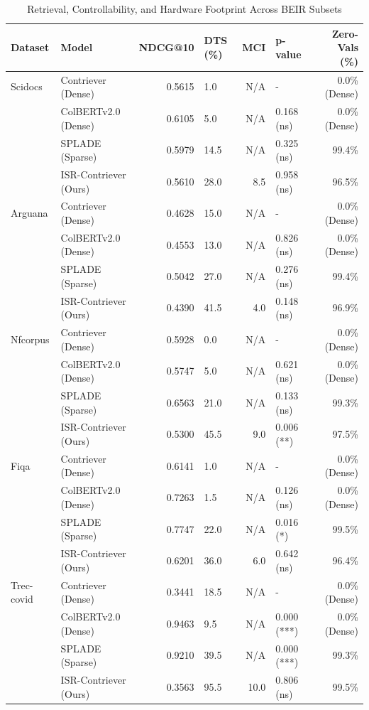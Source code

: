 \documentclass[sigconf,authordraft]{acmart}
\begin{document}
\begin{table}[htbp]
\centering
\caption{Retrieval, Controllability, and Hardware Footprint Across BEIR Subsets}
\label{tab:beir_results}
\begin{tabular}{llrlrlr}
\toprule
Dataset & Model & NDCG@10 & DTS (\%) & MCI & p-value & Zero-Vals (\%) \\
\midrule
Scidocs & Contriever (Dense) & 0.5615 & 1.0 & N/A & - & 0.0\% (Dense) \\
& ColBERTv2.0 (Dense) & 0.6105 & 5.0 & N/A & 0.168 (ns) & 0.0\% (Dense) \\
& SPLADE (Sparse) & 0.5979 & 14.5 & N/A & 0.325 (ns) & 99.4\% \\
& ISR-Contriever (Ours) & 0.5610 & 28.0 & 8.5 & 0.958 (ns) & 96.5\% \\
\midrule
Arguana & Contriever (Dense) & 0.4628 & 15.0 & N/A & - & 0.0\% (Dense) \\
& ColBERTv2.0 (Dense) & 0.4553 & 13.0 & N/A & 0.826 (ns) & 0.0\% (Dense) \\
& SPLADE (Sparse) & 0.5042 & 27.0 & N/A & 0.276 (ns) & 99.4\% \\
& ISR-Contriever (Ours) & 0.4390 & 41.5 & 4.0 & 0.148 (ns) & 96.9\% \\
\midrule
Nfcorpus & Contriever (Dense) & 0.5928 & 0.0 & N/A & - & 0.0\% (Dense) \\
& ColBERTv2.0 (Dense) & 0.5747 & 5.0 & N/A & 0.621 (ns) & 0.0\% (Dense) \\
& SPLADE (Sparse) & 0.6563 & 21.0 & N/A & 0.133 (ns) & 99.3\% \\
& ISR-Contriever (Ours) & 0.5300 & 45.5 & 9.0 & 0.006 (**) & 97.5\% \\
\midrule
Fiqa & Contriever (Dense) & 0.6141 & 1.0 & N/A & - & 0.0\% (Dense) \\
& ColBERTv2.0 (Dense) & 0.7263 & 1.5 & N/A & 0.126 (ns) & 0.0\% (Dense) \\
& SPLADE (Sparse) & 0.7747 & 22.0 & N/A & 0.016 (*) & 99.5\% \\
& ISR-Contriever (Ours) & 0.6201 & 36.0 & 6.0 & 0.642 (ns) & 96.4\% \\
\midrule
Trec-covid & Contriever (Dense) & 0.3441 & 18.5 & N/A & - & 0.0\% (Dense) \\
& ColBERTv2.0 (Dense) & 0.9463 & 9.5 & N/A & 0.000 (***) & 0.0\% (Dense) \\
& SPLADE (Sparse) & 0.9210 & 39.5 & N/A & 0.000 (***) & 99.3\% \\
& ISR-Contriever (Ours) & 0.3563 & 95.5 & 10.0 & 0.806 (ns) & 99.5\% \\
\bottomrule
\end{tabular}
\end{table}
\end{document}
